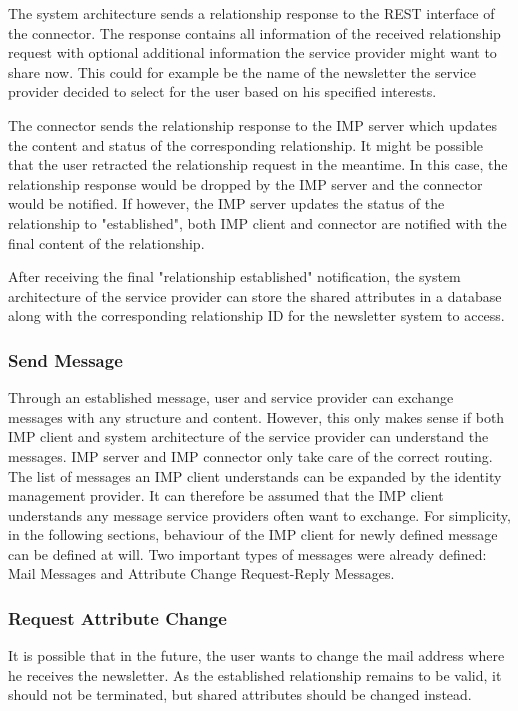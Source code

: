 The system architecture sends a relationship response to the REST interface of the connector. The response contains all information of the received relationship request with optional additional information the service provider might want to share now. This could for example be the name of the newsletter the service provider decided to select for the user based on his specified interests.

The connector sends the relationship response to the IMP server which updates the content and status of the corresponding relationship. It might be possible that the user retracted the relationship request in the meantime. In this case, the relationship response would be dropped by the IMP server and the connector would be notified.
If however, the IMP server updates the status of the relationship to "established", both IMP client and connector are notified with the final content of the relationship.

After receiving the final "relationship established" notification, the system architecture of the service provider can store the shared attributes in a database along with the corresponding relationship ID for the newsletter system to access.

\subsubsection{Send Message}

Through an established message, user and service provider can exchange messages with any structure and content. However, this only makes sense if both IMP client and system architecture of the service provider can understand the messages. IMP server and IMP connector only take care of the correct routing. The list of messages an IMP client understands can be expanded by the identity management provider. It can therefore be assumed that the IMP client understands any message service providers often want to exchange. For simplicity, in the following sections, behaviour of the IMP client for newly defined message can be defined at will. Two important types of messages were already defined: Mail Messages and Attribute Change Request-Reply Messages.

\subsubsection{Request Attribute Change}

It is possible that in the future, the user wants to change the mail address where he receives the newsletter. As the established relationship remains to be valid, it should not be terminated, but shared attributes should be changed instead.

